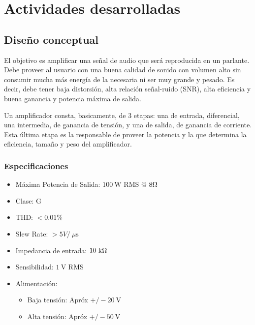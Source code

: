 \documentclass[a4paper,12pt,twoside]{article}
\newcommand{\volt}{\ensuremath{~\mathrm{V}}}
\newcommand{\kohm}{\ensuremath{~\mathrm{k}\ohm}}
\newcommand{\uS}{\ensuremath{~\mu\mathrm{s}}}
\newcommand{\watt}{\ensuremath{~\mathrm{W}}}
\begin{document}


\newpage
\vfill
\tableofcontents
\vfill

\newpage

\section{Actividades desarrolladas}

\subsection{Diseño conceptual}



El objetivo es amplificar una señal de audio que será reproducida en un parlante.  Debe proveer al usuario con una buena calidad de sonido con volumen alto sin consumir mucha más energía de la necesaria ni ser muy grande y pesado. Es decir, debe tener baja distorsión, alta relación señal-ruido (SNR), alta eficiencia y buena ganancia y potencia máxima de salida.

Un amplificador consta, basicamente, de 3 etapas: una de entrada, diferencial, una intermedia, de ganancia de tensión, y una de salida, de ganancia de corriente. Esta última etapa es la responsable de proveer la potencia y la que determina la eficiencia, tamaño y peso del amplificador. 

\subsubsection{Especificaciones}

\bigskip

\begin{itemize}
	\item Máxima Potencia de Salida:  $100\watt$ RMS @ $8\ohm$
	\item Clase: G
	\item THD: $<0.01 \%$  %
	\item Slew Rate: $>5V / \uS$
	\item Impedancia de entrada: $10\kohm$
	\item Sensibilidad: $1\volt$ RMS
	\item Alimentación: 
	\begin{itemize}
		\item Baja tensión: Apróx $ +/-20\volt$ 
		\item Alta tensión: Apróx $ +/-50\volt$
	\end{itemize}
\end{itemize}
\end{document}
